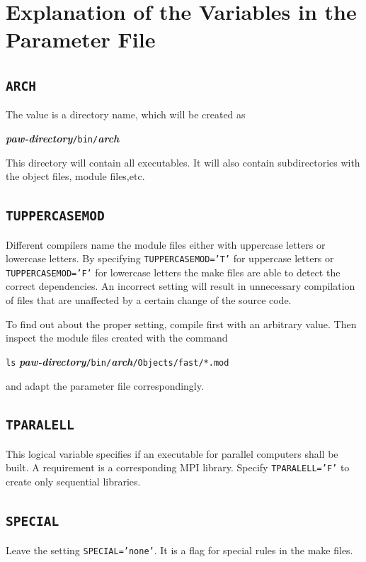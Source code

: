 \documentclass[a4paper,10pt]{report}
\newcommand{\myspec}[1]{\textbf{\textit{#1}}}
\newcommand{\mytt}[1]{{\tt #1}}
\begin{document}
\section{Explanation of the Variables in the  Parameter File}
\subsection{\mytt{ARCH}}
%
The value is a directory name, which will be created as
\begin{center}
\myspec{paw-directory}\mytt{/bin/}\myspec{arch}
\end{center}
This directory will contain all executables. It will also contain
subdirectories with the object files, module files,etc.

\subsection{\mytt{TUPPERCASEMOD}}

Different compilers name the module files either with uppercase
letters or lowercase letters. By specifying \mytt{TUPPERCASEMOD='T'}
for uppercase letters or \mytt{TUPPERCASEMOD='F'} for lowercase
letters the make files are able to detect the correct dependencies.
An incorrect setting will result in unnecessary compilation of files
that are unaffected by a certain change of the source code.

To find out about the proper setting, compile first with an arbitrary value.
Then inspect the module files created with the command
\begin{center}
\mytt{ls} \myspec{paw-directory}\mytt{/bin/}\myspec{arch}\mytt{/Objects/fast/*.mod}
\end{center}
and adapt the parameter file correspondingly.

\subsection{\mytt{TPARALELL}}
%
This logical variable specifies if an executable for parallel computers shall
be built.  A requirement is a corresponding MPI library.  Specify
\mytt{TPARALELL='F'} to create only sequential libraries.

\subsection{\mytt{SPECIAL}}
%
Leave the setting \mytt{SPECIAL='none'}. It is a flag for special rules
in the make files.
\end{document}

